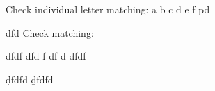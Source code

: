 Check individual letter matching: a b c d e f pd

    dfd
Check \q{} matching: 




dfdf
dfd
f
df
d
dfdf



\d{dfdfd}
\b{dfdfd}